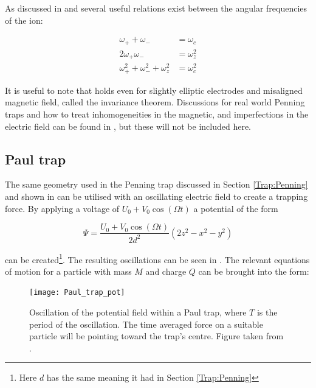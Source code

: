 \documentclass[12pt,twoside]{article}
\begin{document}
As discussed in \cite{Charged_Particle_traps_Penning} and \cite{Penning_traps} several useful relations exist between the angular frequencies of the ion:

\begin{align}
	\omega_+ + \omega_- &= \omega_c
\label{Eq:Useful:cyclotron} \\
	2\omega_+\omega_- &= \omega_z^2
\label{Eq:Useful:cross}\\
	\omega_+^2 + \omega_-^2 + \omega_z^2 &= \omega_c^2
\label{Eq:Useful:squareSum}
\end{align}

It is useful to note that  holds even for slightly elliptic electrodes and misaligned magnetic field, called the invariance theorem\cite{Charged_Particle_traps_Penning,Single_ion_Penning}. Discussions for real world Penning traps and how to treat inhomogeneities in the magnetic, and imperfections in the electric field can be found in \cite{Charged_Particle_traps_Penning}, but these will not be included here.

\subsection{Paul trap}
\label{Trap:Paul}

The same geometry used in the Penning trap discussed in Section \ref{Trap:Penning} and shown in  can be utilised with an oscillating electric field to create a trapping force. By applying a voltage of $U_0 + V_0\cos\left(\Omega t\right)$ a potential of the form

\begin{equation}
	\Psi = \frac{U_0 + V_0\cos\left(\Omega t\right)}{2 d^2}\left(2z^2 - x^2 - y^2\right)
	\label{Eq:PaulPot}
\end{equation}

can be created\footnote{Here $d$ has the same meaning it had in Section \ref{Trap:Penning}}\cite{Charged_Particle_traps_Paul,RF_Traps}. The resulting oscillations can be seen in . The relevant equations of motion for a particle with mass $M$ and charge $Q$ can be brought into the form:

\begin{figure}[t!]
	\centering
	\texttt{[image: Paul\_trap\_pot]}
	\caption[Paul trap potential oscillation]{Oscillation of the potential field within a Paul trap, where $T$ is the period of the oscillation. The time averaged force on a suitable particle will be pointing toward the trap's centre. Figure taken from \cite{Charged_Particle_traps_Paul}.}
	\label{Fig:PaulPot}
\end{figure}
\end{document}
